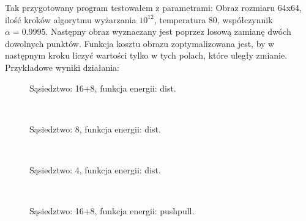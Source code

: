 \documentclass{article}
\begin{document}
        Tak przygotowany program testowałem z parametrami: Obraz rozmiaru 64x64, ilość kroków algorytmu wyżarzania $10^{12}$, temperatura 80, współczynnik $\alpha = 0.9995$. Następny obraz wyznaczany jest poprzez losową zamianę dwóch dowolnych punktów. Funkcja kosztu obrazu zoptymalizowana jest, by w następnym kroku liczyć wartości tylko w tych polach, które uległy zmianie.\\
        Przykładowe wyniki działania: 
        \begin{figure}[h!]
            \centering
            \caption{Sąsiedztwo: 16+8, funkcja energii: dist.}
        \end{figure}\\
        \begin{figure}[h!]
            \centering
            \caption{Sąsiedztwo: 8, funkcja energii: dist.}
        \end{figure}\\
        \begin{figure}[h!]
            \centering
            \caption{Sąsiedztwo: 4, funkcja energii: dist.}
        \end{figure}\\
        \begin{figure}[h!]
            \centering
            \caption{Sąsiedztwo: 16+8, funkcja energii: pushpull.}
        \end{figure}\\
\end{document}

